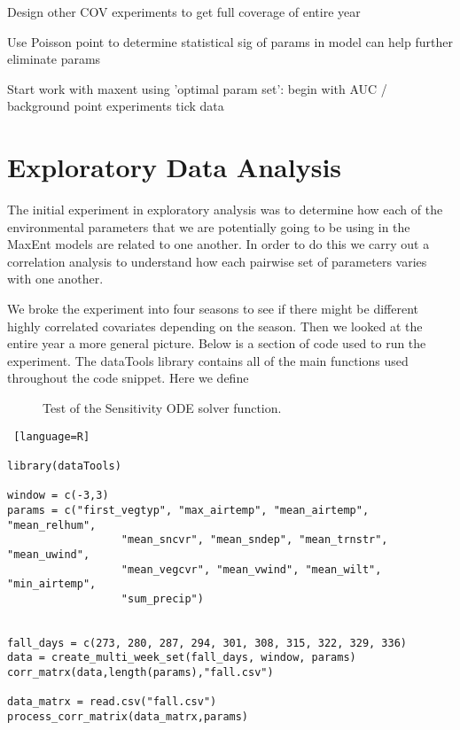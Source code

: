 Design other COV experiments to get full coverage of entire year \newline

Use Poisson point to determine statistical sig of params in model can help further eliminate params\newline

Start work with maxent using 'optimal param set': \newline
begin with AUC / background point experiments \newline
tick data \newline
\pagebreak


\section{Exploratory Data Analysis }

The initial experiment in exploratory analysis was to determine how each of the environmental parameters that we are potentially going to be using in the MaxEnt models are related to one another. In order to do this we carry out a correlation analysis to understand how each pairwise set of parameters varies with one another. \newline

\noindent We broke the experiment into four seasons to see if there might be different highly correlated covariates depending on the season. Then we looked at the entire year a more general picture. Below is a section of code used to run the experiment. The dataTools library contains all of the main functions used throughout the code snippet. Here we define 

\begin{figure} [t]
\centerline{}
\caption{Test of the Sensitivity ODE solver function.}
\label{fig6}
\end{figure}


\begin{lstlisting} [language=R]

library(dataTools)

window = c(-3,3)
params = c("first_vegtyp", "max_airtemp", "mean_airtemp", "mean_relhum", 
                  "mean_sncvr", "mean_sndep", "mean_trnstr", "mean_uwind", 
                  "mean_vegcvr", "mean_vwind", "mean_wilt", "min_airtemp", 
                  "sum_precip")
           
           
fall_days = c(273, 280, 287, 294, 301, 308, 315, 322, 329, 336)
data = create_multi_week_set(fall_days, window, params)
corr_matrx(data,length(params),"fall.csv")

data_matrx = read.csv("fall.csv")
process_corr_matrix(data_matrx,params)

\end{lstlisting}

